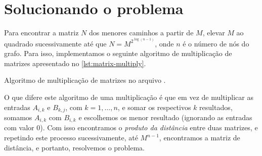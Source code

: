 \section{Solucionando o problema}

Para encontrar a matriz \(N\) dos menores caminhos a partir de \(M\), 
elevar \(M\) ao quadrado sucessivamente até que \(N = M^{2^{\log(n-1)}}\),
onde \(n\) é o número de nós do grafo. Para isso, implementamos o seguinte
algoritmo de multiplicação de matrizes apresentado no
\cref{lst:matrix-multiply}.

\begin{listing}
\caption{Algoritmo de multiplicação de matrizes no arquivo .}
\label{lst:matrix-multiply}
\end{listing}

O que difere este algoritmo de uma multiplicação é 
que em vez de multiplicar as entradas \(A_{i,k}\) e
\(B_{k,j}\), com \(k=1,\ldots,n\), e somar os respectivos
\(k\) resultados, somamos \(A_{i,k}\) com \(B_{i,k}\) e
escolhemos os menor resultado (ignorando as entradas com 
valor 0). Com isso encontramos o \emph{produto da distância}
entre duas matrizes, e repetindo este processo sucessivamente,
até \(M^{n-1}\), encontramos a matriz de distância, e portanto,
resolvemos o problema.
